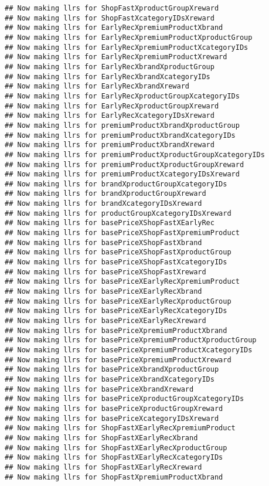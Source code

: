 \documentclass[10pt]{report}
\begin{document}
\begin{verbatim}
## Now making llrs for ShopFastXproductGroupXreward
## Now making llrs for ShopFastXcategoryIDsXreward
## Now making llrs for EarlyRecXpremiumProductXbrand
## Now making llrs for EarlyRecXpremiumProductXproductGroup
## Now making llrs for EarlyRecXpremiumProductXcategoryIDs
## Now making llrs for EarlyRecXpremiumProductXreward
## Now making llrs for EarlyRecXbrandXproductGroup
## Now making llrs for EarlyRecXbrandXcategoryIDs
## Now making llrs for EarlyRecXbrandXreward
## Now making llrs for EarlyRecXproductGroupXcategoryIDs
## Now making llrs for EarlyRecXproductGroupXreward
## Now making llrs for EarlyRecXcategoryIDsXreward
## Now making llrs for premiumProductXbrandXproductGroup
## Now making llrs for premiumProductXbrandXcategoryIDs
## Now making llrs for premiumProductXbrandXreward
## Now making llrs for premiumProductXproductGroupXcategoryIDs
## Now making llrs for premiumProductXproductGroupXreward
## Now making llrs for premiumProductXcategoryIDsXreward
## Now making llrs for brandXproductGroupXcategoryIDs
## Now making llrs for brandXproductGroupXreward
## Now making llrs for brandXcategoryIDsXreward
## Now making llrs for productGroupXcategoryIDsXreward
## Now making llrs for basePriceXShopFastXEarlyRec
## Now making llrs for basePriceXShopFastXpremiumProduct
## Now making llrs for basePriceXShopFastXbrand
## Now making llrs for basePriceXShopFastXproductGroup
## Now making llrs for basePriceXShopFastXcategoryIDs
## Now making llrs for basePriceXShopFastXreward
## Now making llrs for basePriceXEarlyRecXpremiumProduct
## Now making llrs for basePriceXEarlyRecXbrand
## Now making llrs for basePriceXEarlyRecXproductGroup
## Now making llrs for basePriceXEarlyRecXcategoryIDs
## Now making llrs for basePriceXEarlyRecXreward
## Now making llrs for basePriceXpremiumProductXbrand
## Now making llrs for basePriceXpremiumProductXproductGroup
## Now making llrs for basePriceXpremiumProductXcategoryIDs
## Now making llrs for basePriceXpremiumProductXreward
## Now making llrs for basePriceXbrandXproductGroup
## Now making llrs for basePriceXbrandXcategoryIDs
## Now making llrs for basePriceXbrandXreward
## Now making llrs for basePriceXproductGroupXcategoryIDs
## Now making llrs for basePriceXproductGroupXreward
## Now making llrs for basePriceXcategoryIDsXreward
## Now making llrs for ShopFastXEarlyRecXpremiumProduct
## Now making llrs for ShopFastXEarlyRecXbrand
## Now making llrs for ShopFastXEarlyRecXproductGroup
## Now making llrs for ShopFastXEarlyRecXcategoryIDs
## Now making llrs for ShopFastXEarlyRecXreward
## Now making llrs for ShopFastXpremiumProductXbrand

\end{verbatim}
\end{document}
